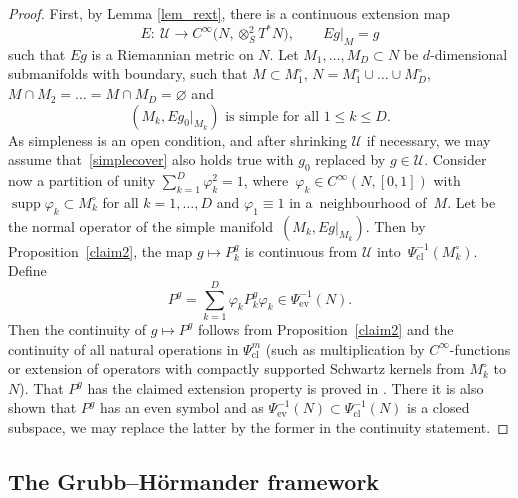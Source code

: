 \documentclass[10pt,a4paper]{amsart}
\numberwithin{equation}{section}
\theoremstyle{definition}
\newcommand{\ev}{\mathrm{ev}}
\newcommand{\1}{{\bf 1}}
\DeclareMathOperator{\supp}{supp}
\newcommand{\cl}{\mathrm{cl}}
\begin{document}
\begin{proof}
	First, by Lemma \ref{lem_rext}, there is a continuous extension map
	\[
		E\colon \ \mathcal U\rightarrow C^\infty\bigl(N,\otimes^2_S T^*N\bigr),\qquad Eg|_{M} =g
	\]	
	such that $Eg$ is a Riemannian metric on $N$. Let $M_1,\dots, M_D\subset N$ be $d$-dimensional submanifolds with boundary, such that $M\subset M_1^\circ$, $N=M_1^\circ\cup\dots\cup M_D^\circ$, $M\cap M_2=\dots= M\cap M_D=\varnothing$ and
	\begin{equation}\label{simplecover}
		(M_k,Eg_0|_{M_k}) \text{ is simple for all } 1\le k \le D.
	\end{equation}
	As simpleness is an open condition, and after shrinking $\mathcal U$ if necessary, we may assume that~\eqref{simplecover} also holds true with $g_0$ replaced by $g\in \mathcal U$. Consider now a partition of unity ${\sum_{k=1}^D\varphi_k^2 = 1}$, where~$\varphi_k\in C^\infty(N,[0,1])$ with $\supp \varphi_k \subset M_k^\circ$ for all $k=1,\dots, D$ and $\varphi_1\equiv 1$ in a~neighbourhood of~$M$. Let \smash{$
	P_k^g:=N_0^{Eg\vert_{M_k}}\in \Psi_{\cl}^{-1}(M_k^\circ)
	$}
	be the normal operator of the simple manifold~$(M_k,E g\vert_{M_k})$. Then by Proposition~\ref{claim2}, the map
$g\mapsto\! P^g_k$ is continuous from $\mathcal U$ into~$\Psi_\cl^{-1}(M_k^\circ)$.
Define
\[
P^g = \sum_{k=1}^D \varphi_k P^g_k \varphi_k \in \Psi^{-1}_\ev(N).
\]
Then the continuity of $g\mapsto P^g$ follows from Proposition~\ref{claim2} and the continuity of all natural operations in $\Psi_\cl^{m}$ (such as multiplication by $C^\infty$-functions or extension of operators with compactly supported Schwartz kernels from $M_k^\circ$ to $N$). That $P^g$ has the claimed extension property is proved in \cite[Section~4.1]{MNP19a}. There it is also shown that $P^g$ has an even symbol and as $\Psi^{-1}_\ev(N)\subset \Psi^{-1}_\cl(N)$ is a closed subspace, we may replace the latter by the former in the continuity statement.
\end{proof}



\subsection{The Grubb--H{\"o}rmander framework}\label{s_gruho}
\end{document}
